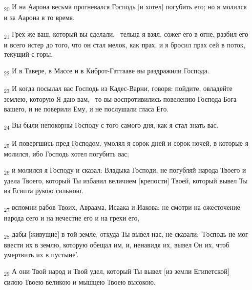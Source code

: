 \begin{tcolorbox}
\textsubscript{20} И на Аарона весьма прогневался Господь [и хотел] погубить его; но я молился и за Аарона в то время.
\end{tcolorbox}
\begin{tcolorbox}
\textsubscript{21} Грех же ваш, который вы сделали, --тельца я взял, сожег его в огне, разбил его и всего истер до того, что он стал мелок, как прах, и я бросил прах сей в поток, текущий с горы.
\end{tcolorbox}
\begin{tcolorbox}
\textsubscript{22} И в Тавере, в Массе и в Киброт-Гаттааве вы раздражили Господа.
\end{tcolorbox}
\begin{tcolorbox}
\textsubscript{23} И когда посылал вас Господь из Кадес-Варни, говоря: пойдите, овладейте землею, которую Я даю вам, --то вы воспротивились повелению Господа Бога вашего, и не поверили Ему, и не послушали гласа Его.
\end{tcolorbox}
\begin{tcolorbox}
\textsubscript{24} Вы были непокорны Господу с того самого дня, как я стал знать вас.
\end{tcolorbox}
\begin{tcolorbox}
\textsubscript{25} И повергшись пред Господом, умолял я сорок дней и сорок ночей, в которые я молился, ибо Господь хотел погубить вас;
\end{tcolorbox}
\begin{tcolorbox}
\textsubscript{26} и молился я Господу и сказал: Владыка Господи, не погубляй народа Твоего и удела Твоего, который Ты избавил величием [крепости] Твоей, который вывел Ты из Египта рукою сильною.
\end{tcolorbox}
\begin{tcolorbox}
\textsubscript{27} вспомни рабов Твоих, Авраама, Исаака и Иакова; не смотри на ожесточение народа сего и на нечестие его и на грехи его,
\end{tcolorbox}
\begin{tcolorbox}
\textsubscript{28} дабы [живущие] в той земле, откуда Ты вывел нас, не сказали: 'Господь не мог ввести их в землю, которую обещал им, и, ненавидя их, вывел Он их, чтоб умертвить их в пустыне'.
\end{tcolorbox}
\begin{tcolorbox}
\textsubscript{29} А они Твой народ и Твой удел, который Ты вывел [из земли Египетской] силою Твоею великою и мышцею Твоею высокою.
\end{tcolorbox}
